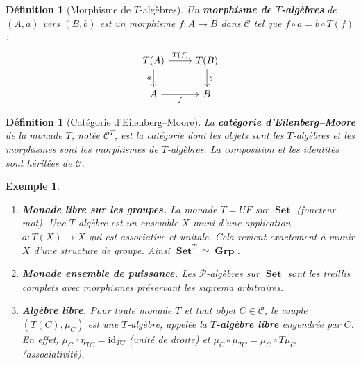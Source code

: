 \documentclass[a4paper,12pt]{book}
\DeclareMathOperator{\Set}{\mathbf{Set}}
\DeclareMathOperator{\Grp}{\mathbf{Grp}}
\newcommand{\id}{\mathrm{id}}
\newtheorem{definition}[theoreme]{Définition}
\newtheorem{exemple}[theoreme]{Exemple}
\begin{document}
\begin{definition}[Morphisme de $T$-algèbres]\label{def:morphisme-T-algebre}
Un \textbf{morphisme de $T$-algèbres} de $(A, a)$ vers $(B, b)$ est
un morphisme $f \colon A \to B$ dans $\mathcal{C}$ tel que
$f \circ a = b \circ T(f)$ :
\[
\begin{tikzcd}
T(A) \arrow[r, "T(f)"] \arrow[d, "a"'] & T(B) \arrow[d, "b"] \\
A \arrow[r, "f"'] & B
\end{tikzcd}
\]
\end{definition}

\begin{definition}[Catégorie d'Eilenberg--Moore]\label{def:categorie-EM}
La \textbf{catégorie d'Eilenberg--Moore} de la monade $T$,
notée $\mathcal{C}^T$, est la catégorie dont les objets sont les
$T$-algèbres et les morphismes sont les morphismes de $T$-algèbres.
La composition et les identités sont héritées de $\mathcal{C}$.
\end{definition}

\begin{exemple}\label{ex:T-algebres}
\begin{enumerate}[label=(\roman*)]
\item \textbf{Monade libre sur les groupes.}
    La monade $T = UF$ sur $\Set$ (foncteur mot).
    Une $T$-algèbre est un ensemble $X$ muni d'une application
    $a \colon T(X) \to X$ qui est associative et unitale.
    Cela revient exactement à munir $X$ d'une structure de groupe.
    Ainsi $\Set^T \simeq \Grp$.

\item \textbf{Monade ensemble de puissance.}
    Les $\mathcal{P}$-algèbres sur $\Set$ sont les treillis complets
    avec morphismes préservant les suprema arbitraires.

\item \textbf{Algèbre libre.}
    Pour toute monade $T$ et tout objet $C \in \mathcal{C}$,
    le couple $(T(C), \mu_C)$ est une $T$-algèbre, appelée
    la \textbf{$T$-algèbre libre}
    engendrée par $C$.
    En effet, $\mu_C \circ \eta_{TC} = \id_{TC}$ (unité de droite)
    et $\mu_C \circ \mu_{TC} = \mu_C \circ T\mu_C$ (associativité).
\end{enumerate}
\end{exemple}
\end{document}
